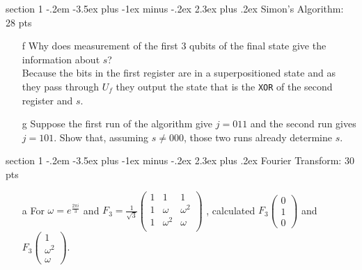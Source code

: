 \documentclass[12pt]{article}
\makeatletter
\newcommand{\<}{\langle}
\renewcommand{\>}{\rangle}
\newenvironment{problem}{\@startsection
       {section}
       {1}
       {-.2em}
       {-3.5ex plus -1ex minus -.2ex}
       {2.3ex plus .2ex}
       {\pagebreak[3]
       \large\bf\noindent{Problem }
       }
       }
       {%
       \begin{center}\large\bf \end{center}}
\makeatother
\begin{document}
\begin{problem}{Simon's Algorithm: 28 pts}
\begin{enumerate}
\item[f] Why does measurement of the first $3$ qubits of the final state give the information about $s$?\\
Because the bits in the first register are in a superpositioned state and as they pass through $U_f$ they output the state that is the \texttt{XOR} of the second register and $s$.
\item[g] Suppose the first run of the algorithm give $j = 011$ and the second run gives $j = 101$. Show that, assuming $s \neq 000$, those two runs already determine $s$.\\
\end{enumerate}
\end{problem}

\begin{problem}{Fourier Transform: 30 pts}
\begin{enumerate}
\item[a] For $\omega = e^{\frac{2\pi i}{3}}$ and $F_3  = \frac{1}{\sqrt{3}}\left(\begin{array}{ccc}
																      1&1&1\\
																      1&\omega&\omega^2\\
																      1&\omega^2&\omega\\
																	  \end{array}  \right)$
, calculated $F_3\left(\begin{array}{c}
0\\1\\0
\end{array}  \right)$ and  $F_3\left(\begin{array}{c}
1\\\omega^2\\\omega
\end{array}  \right)$.\\
\end{enumerate}
\end{problem}
\end{document}
